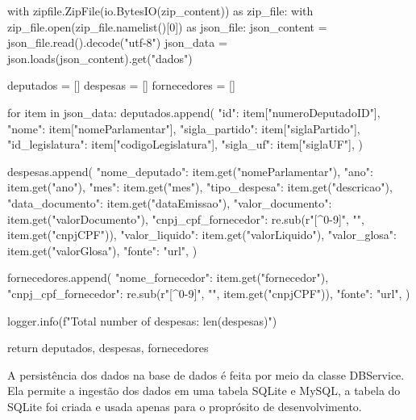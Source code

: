 \documentclass[12pt, a4paper]{article}
\begin{document}
\begin{python}
		with zipfile.ZipFile(io.BytesIO(zip_content)) as zip_file:
			with zip_file.open(zip_file.namelist()[0]) as json_file:
				json_content = json_file.read().decode("utf-8")
				json_data = json.loads(json_content).get("dados")
		
		deputados = []
		despesas = []
		fornecedores = []
		
		for item in json_data:
			deputados.append({
				"id": item["numeroDeputadoID"],
				"nome": item["nomeParlamentar"],
				"sigla_partido": item["siglaPartido"],
				"id_legislatura": item["codigoLegislatura"],
				"sigla_uf": item["siglaUF"],
			})
			
			despesas.append({
				"nome_deputado": item.get("nomeParlamentar"),
				"ano": item.get("ano"),
				"mes": item.get("mes"),
				"tipo_despesa": item.get("descricao"),
				"data_documento": item.get("dataEmissao"),
				"valor_documento": item.get("valorDocumento"),
				"cnpj_cpf_fornecedor": re.sub(r"[^0-9]", "", item.get("cnpjCPF")),
				"valor_liquido": item.get("valorLiquido"),
				"valor_glosa": item.get("valorGlosa"),
				"fonte": "url",
			})
			
			fornecedores.append({
				"nome_fornecedor": item.get("fornecedor"),
				"cnpj_cpf_fornecedor": re.sub(r"[^0-9]", "", item.get("cnpjCPF")),
				"fonte": "url",
			})
		
		logger.info(f"Total number of despesas: {len(despesas)}")
		
		return deputados, despesas, fornecedores
\end{python}

A persistência dos dados na base de dados é feita por meio da classe DBService. Ela permite a ingestão dos dados em uma tabela SQLite e MySQL, a tabela do SQLite foi criada e usada apenas para o proprósito de desenvolvimento.
\end{document}
